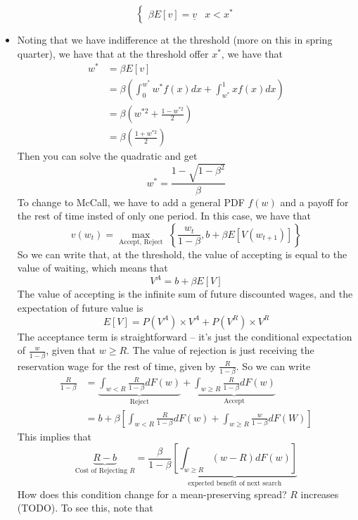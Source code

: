 \documentclass[12pt]{article}
\begin{document}
\begin{itemize}
\[\begin{cases}
    \beta E[v] = \underline{v} & x < x^*
    \end{cases}\]
    \item Noting that we have indifference at the threshold (more on this in spring quarter), we have that at the threshold offer $x^*$, we have that 
    \[\begin{split}
        w^* &= \beta E[v] \\
        &= \beta\left(\int_0^{w^*}w^*f(x)dx + \int_{w^*}^1xf(x)dx\right) \\
        &= \beta \left(w^{*2} + \frac{1 - w^{*2}}{2}\right) \\
        &= \beta \left(\frac{1 + w^{*2}}{2}\right)
    \end{split}\]
    Then you can solve the quadratic and get
    \[w^* = \frac{1 - \sqrt{1-\beta^2}}{\beta}\]
    To change to McCall, we have to add a general PDF $f(w)$ and a payoff for the rest of time insted of only one period. In this case, we have that
    \[v(w_t) = \max_{\text{Accept, Reject}}\; \left\{\frac{w_t}{1-\beta}, b + \beta E[V(w_{t+1})]\right\}\]
    So we can write that, at the threshold, the value of accepting is equal to the value of waiting, which means that
    \[V^A = b + \beta E[V]\]
    The value of accepting is the infinite sum of future discounted wages, and the expectation of future value is 
    \[E[V] = P(V^A) \times V^A + P(V^R) \times V^R\]
    The acceptance term is straightforward -- it's just the conditional expectation of $\frac{w}{1-\beta}$, given that $w \geq R$. The value of rejection is just receiving the reservation wage for the rest of time, given by $\frac{R}{1-\beta}$. So we can write
    \[\begin{split}
        \frac{R}{1-\beta} &= \underbrace{\int_{w<R}\frac{R}{1-\beta}dF(w)}_{\text{Reject}} + \underbrace{\int_{w\geq R}\frac{R}{1-\beta}dF(w)}_{\text{Accept}} \\
        &= b + \beta\left[\int_{w < R}\frac{R}{1-\beta}dF(w) + \int_{w\geq R} \frac{w}{1-\beta}dF(W)\right]
    \end{split}\]
    This implies that
    \begin{equation}\label{McCall Equilibrium}
        \underbrace{R-b}_{\text{Cost of Rejecting $R$}} = \frac{\beta}{1-\beta}\underbrace{\left[\int_{w\geq R}(w-R)dF(w)\right]}_{\text{expected benefit of next search}}
    \end{equation}
    How does this condition change for a mean-preserving spread? $R$ increases (TODO). To see this, note that
    \begin{equation}\label{Mean Preserving Spread}

\end{equation}
\end{itemize}
\end{document}
